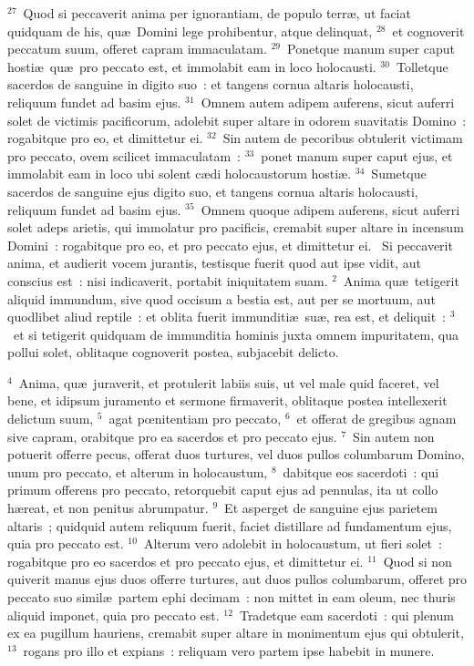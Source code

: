${}^{27}$~Quod si peccaverit anima per ignorantiam, de populo terr\ae , ut faciat quidquam de his, qu\ae\ Domini lege prohibentur, atque delinquat,
${}^{28}$~et cognoverit peccatum suum, offeret capram immaculatam.
${}^{29}$~Ponetque manum super caput hosti\ae\ qu\ae\ pro peccato est, et immolabit eam in loco holocausti.
${}^{30}$~Tolletque sacerdos de sanguine in digito suo~: et tangens cornua altaris holocausti, reliquum fundet ad basim ejus.
${}^{31}$~Omnem autem adipem auferens, sicut auferri solet de victimis pacificorum, adolebit super altare in odorem suavitatis Domino~: rogabitque pro eo, et dimittetur ei.
${}^{32}$~Sin autem de pecoribus obtulerit victimam pro peccato, ovem scilicet immaculatam~:
${}^{33}$~ponet manum super caput ejus, et immolabit eam in loco ubi solent c\ae di holocaustorum hosti\ae .
${}^{34}$~Sumetque sacerdos de sanguine ejus digito suo, et tangens cornua altaris holocausti, reliquum fundet ad basim ejus.
${}^{35}$~Omnem quoque adipem auferens, sicut auferri solet adeps arietis, qui immolatur pro pacificis, cremabit super altare in incensum Domini~: rogabitque pro eo, et pro peccato ejus, et dimittetur ei.
~\lettrine[lines=10,image=true,loversize=0.05,lraise=-0.03]{S}{}i peccaverit anima, et audierit vocem jurantis, testisque fuerit quod aut ipse vidit, aut conscius est~: nisi indicaverit, portabit iniquitatem suam.
${}^{2}$~Anima qu\ae\ tetigerit aliquid immundum, sive quod occisum a bestia est, aut per se mortuum, aut quodlibet aliud reptile~: et oblita fuerit immunditi\ae\ su\ae , rea est, et deliquit~:
${}^{3}$~et si tetigerit quidquam de immunditia hominis juxta omnem impuritatem, qua pollui solet, oblitaque cognoverit postea, subjacebit delicto.


${}^{4}$~Anima, qu\ae\ juraverit, et protulerit labiis suis, ut vel male quid faceret, vel bene, et idipsum juramento et sermone firmaverit, oblitaque postea intellexerit delictum suum,
${}^{5}$~agat pœnitentiam pro peccato,
${}^{6}$~et offerat de gregibus agnam sive capram, orabitque pro ea sacerdos et pro peccato ejus.
${}^{7}$~Sin autem non potuerit offerre pecus, offerat duos turtures, vel duos pullos columbarum Domino, unum pro peccato, et alterum in holocaustum,
${}^{8}$~dabitque eos sacerdoti~: qui primum offerens pro peccato, retorquebit caput ejus ad pennulas, ita ut collo h\ae reat, et non penitus abrumpatur.
${}^{9}$~Et asperget de sanguine ejus parietem altaris~; quidquid autem reliquum fuerit, faciet distillare ad fundamentum ejus, quia pro peccato est.
${}^{10}$~Alterum vero adolebit in holocaustum, ut fieri solet~: rogabitque pro eo sacerdos et pro peccato ejus, et dimittetur ei.
${}^{11}$~Quod si non quiverit manus ejus duos offerre turtures, aut duos pullos columbarum, offeret pro peccato suo simil\ae\ partem ephi decimam~: non mittet in eam oleum, nec thuris aliquid imponet, quia pro peccato est.
${}^{12}$~Tradetque eam sacerdoti~: qui plenum ex ea pugillum hauriens, cremabit super altare in monimentum ejus qui obtulerit,
${}^{13}$~rogans pro illo et expians~: reliquam vero partem ipse habebit in munere.


